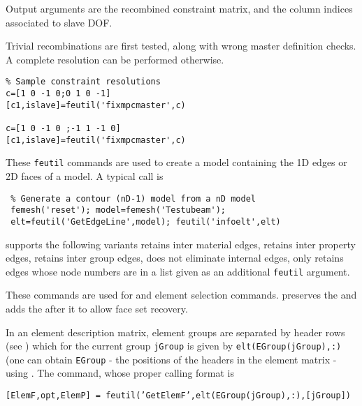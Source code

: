 \noindent Output arguments are the recombined constraint matrix, and the column indices associated to slave DOF.

Trivial recombinations are first tested, along with wrong master definition checks. A complete resolution can be performed otherwise.

\begin{verbatim}
% Sample constraint resolutions
c=[1 0 -1 0;0 1 0 -1]
[c1,islave]=feutil('fixmpcmaster',c)

c=[1 0 -1 0 ;-1 1 -1 0]
[c1,islave]=feutil('fixmpcmaster',c)
\end{verbatim}%



These {\tt feutil} commands are used to create a model containing the 1D edges or 2D faces of a model. A typical call is

\begin{verbatim}
 % Generate a contour (nD-1) model from a nD model
 femesh('reset'); model=femesh('Testubeam');
 elt=feutil('GetEdgeLine',model); feutil('infoelt',elt)
\end{verbatim}%

 supports the following variants  retains inter material edges,  retains inter property edges,  retains inter group edges,  does not eliminate internal edges,  only retains edges whose node numbers are in a list given as an additional {\tt feutil} argument.

These commands are used for  and  element selection commands.  preserves the  and adds the  after it to allow face set recovery.


 In an element description matrix, element groups are separated by header rows (see ) which for the current group {\tt jGroup} is given by {\tt elt(EGroup(jGroup),:)} (one can obtain {\tt EGroup} - the positions of the headers in the element matrix - using . The  command, whose proper calling format is

\noindent 
{\tt [ElemF,opt,ElemP] = feutil('GetElemF',elt(EGroup(jGroup),:),[jGroup])}

